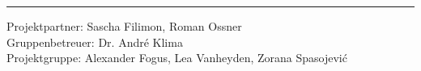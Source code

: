 \documentclass[12pt]{scrreprt}
\begin{document}
\begin{titlepage}
{		\vspace{1cm}
		
		\hrule
		
			\vspace{7cm}
				
			\begin{flushleft}
				Projektpartner: Sascha Filimon, Roman Ossner\\ 
				Gruppenbetreuer: Dr. Andr\'{e} Klima\\ 
				Projektgruppe: Alexander Fogus, Lea Vanheyden, Zorana Spasojevi\'{c}
			\end{flushleft}
		}
\end{titlepage}
	
	
	
\vspace{5cm}		
\thispagestyle{empty}
		
	
	
\begingroup
	
	
\tableofcontents	
\newpage	
\listoffigures	
\listoftables			
\endgroup
	
\newpage	
\end{document}
